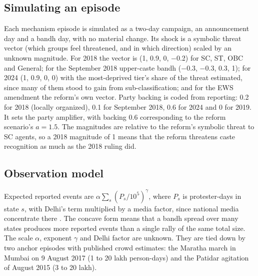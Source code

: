 \documentclass[11pt,a4paper]{article}
\begin{document}
\subsection{Simulating an episode}
Each mechanism episode is simulated as a two-day campaign, an announcement day and a bandh day, with no material change. Its shock is a symbolic threat vector (which groups feel threatened, and in which direction) scaled by an unknown magnitude. For 2018 the vector is (1, 0.9, 0, $-$0.2) for SC, ST, OBC and General; for the September 2018 upper-caste bandh ($-$0.3, $-$0.3, 0.3, 1); for 2024 (1, 0.9, 0, 0) with the most-deprived tier's share of the threat estimated, since many of them stood to gain from sub-classification; and for the EWS amendment the reform's own vector. Party backing is coded from reporting: 0.2 for 2018 (locally organized), 0.1 for September 2018, 0.6 for 2024 and 0 for 2019. It sets the party amplifier, with backing 0.6 corresponding to the reform scenario's $a=1.5$. The magnitudes are relative to the reform's symbolic threat to SC agents, so a 2018 magnitude of 1 means that the reform threatens caste recognition as much as the 2018 ruling did.

\subsection{Observation model}
Expected reported events are $\alpha\sum_s (P_s/10^5)^{\gamma}$, where $P_s$ is protester-days in state $s$, with Delhi's term multiplied by a media factor, since national media concentrate there \citep{hammond2014}. The concave form means that a bandh spread over many states produces more reported events than a single rally of the same total size. The scale $\alpha$, exponent $\gamma$ and Delhi factor are unknown. They are tied down by two anchor episodes with published crowd estimates: the Maratha march in Mumbai on 9 August 2017 (1 to 20 lakh person-days) and the Patidar agitation of August 2015 (3 to 20 lakh).
\end{document}
